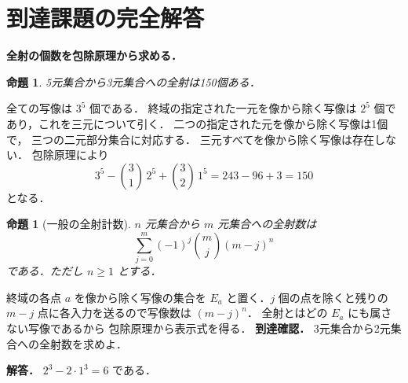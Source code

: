 \documentclass[a5paper,10pt,onecolumn]{jsarticle}
\makeatletter
\theoremstyle{mathnotetheorem}
\newtheorem{proposition}[theorem]{命題}
\renewcommand{\proofname}{証明}
\renewenvironment{proof}[1][\proofname]{%
  \par\pushQED{\qed}\normalfont\topsep4\p@\@plus2\p@\relax
  \trivlist\item[\hskip\labelsep\bfseries #1]\ignorespaces
}{\popQED\endtrivlist\@endpefalse}
\makeatother
\begin{document}
\section{到達課題の完全解答}
\noindent\textbf{全射の個数を包除原理から求める．}
\begin{proposition}
5元集合から3元集合への全射は150個ある．
\end{proposition}
\begin{proof}
全ての写像は $3^5$ 個である．
終域の指定された一元を像から除く写像は
$2^5$ 個であり，これを三元について引く．
二つの指定された元を像から除く写像は1個で，
三つの二元部分集合に対応する．
三元すべてを像から除く写像は存在しない．
包除原理により
\[
3^5-\binom31\,2^5+\binom32\,1^5
=243-96+3=150
\]
となる．
\end{proof}
\begin{proposition}[一般の全射計数]
$n$ 元集合から $m$ 元集合への全射数は
\[
\sum_{j=0}^m(-1)^j\binom mj(m-j)^n
\]
である．ただし $n\ge1$ とする．
\end{proposition}
\begin{proof}
終域の各点 $a$ を像から除く写像の集合を
$E_a$ と置く．$j$ 個の点を除くと残りの
$m-j$ 点に各入力を送るので写像数は $(m-j)^n$．
全射とはどの $E_a$ にも属さない写像であるから
包除原理から表示式を得る．
\end{proof}
\noindent\textbf{到達確認．}
3元集合から2元集合への全射数を求めよ．
\par\noindent\textbf{解答．}
$2^3-2\cdot1^3=6$ である．
\end{document}
